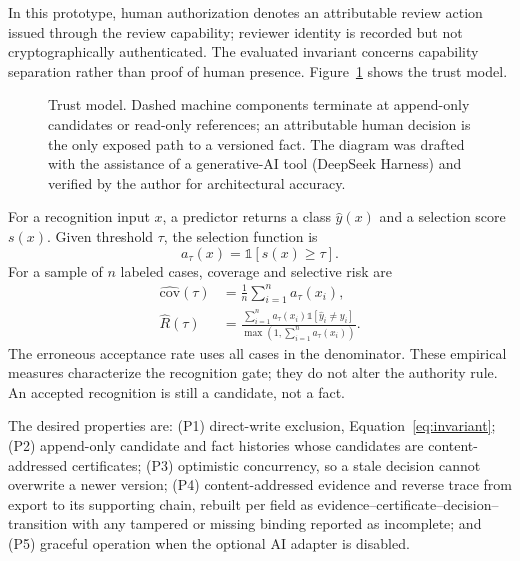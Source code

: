 In this prototype, human authorization denotes an attributable review action issued through the review capability; reviewer identity is recorded but not cryptographically authenticated. The evaluated invariant concerns capability separation rather than proof of human presence. Figure~\ref{fig:trust-model} shows the trust model.

\begin{figure}[t]
  \centering
  \resizebox{0.96\textwidth}{!}{}
  \caption{Trust model. Dashed machine components terminate at append-only candidates or read-only references; an attributable human decision is the only exposed path to a versioned fact. The diagram was drafted with the assistance of a generative-AI tool (DeepSeek Harness) and verified by the author for architectural accuracy.}
  \label{fig:trust-model}
\end{figure}

For a recognition input $x$, a predictor returns a class $\hat y(x)$ and a selection score $s(x)$. Given threshold $\tau$, the selection function is
\begin{equation}
  a_\tau(x)=\mathbb{1}[s(x)\geq\tau].
\end{equation}
For a sample of $n$ labeled cases, coverage and selective risk are
\begin{align}
  \widehat{\mathrm{cov}}(\tau)&=\frac{1}{n}\sum_{i=1}^{n}a_\tau(x_i),\\
  \widehat{R}(\tau)&=\frac{\sum_{i=1}^{n}a_\tau(x_i)\mathbb{1}[\hat y_i\neq y_i]}{\max(1,\sum_{i=1}^{n}a_\tau(x_i))}.
\end{align}
The erroneous acceptance rate uses all cases in the denominator. These empirical measures characterize the recognition gate; they do not alter the authority rule. An accepted recognition is still a candidate, not a fact.

The desired properties are: (P1) direct-write exclusion, Equation~\ref{eq:invariant}; (P2) append-only candidate and fact histories whose candidates are content-addressed certificates; (P3) optimistic concurrency, so a stale decision cannot overwrite a newer version; (P4) content-addressed evidence and reverse trace from export to its supporting chain, rebuilt per field as evidence--certificate--decision--transition with any tampered or missing binding reported as incomplete; and (P5) graceful operation when the optional AI adapter is disabled.
